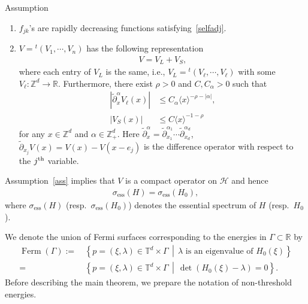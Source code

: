 \documentclass[10pt]{amsart}
\theoremstyle{definition}\newtheorem{defi}[theo]{Definition}\newtheorem{rema}[theo]{Remark}\newtheorem{exam}[theo]{Example}\newtheorem{exem}[theo]{Example}\newtheorem{nota}[theo]{Notation}
\renewcommand{\a}{\alpha}
\renewcommand{\l}{\lambda}
\newcommand{\x}{\xi}
\newcommand{\R}{\mathbb{R}}
\newcommand{\Z}{\mathbb{Z}}
\newcommand{\T}{\mathbb{T}}
\newcommand{\HS}{\mathcal{H}}
\newcommand{\la}{\langle}
\newcommand{\ra}{\rangle}
\DeclareMathOperator{\Ferm}{Ferm}
\begin{document}
\begin{enonce}{Assumption}\label{ass}\leavevmode
\begin{enumerate}
\item\label{assum1.1.1} $f_{jk}$'s are rapidly decreasing functions satisfying~\eqref{selfadj}.

\item\label{assum1.1.2} $V={}^t(V_1, \cdots, V_n)$ has the following representation
\begin{align*}
V=V_L + V_S,
\end{align*}
where each entry of $V_L$ is the same, i.e., $V_L={}^t(V_\ell, \cdots, V_\ell)$ with some $V_\ell : \Z^d \to \R$. Furthermore, there exist $\rho>0$ and $C,C_\a>0$ such that
\begin{align}
\left|\tilde\partial_x^\a V_\ell(x)\right| &\leq C_\a \la x \ra^{-\rho-|\a|}, \label{long range}
\\
|V_S(x)| &\leq C \la x \ra^{-1-\rho} \label{short range}
\end{align}
for any $x\in\Z^d$ and $\a\in\Z_+^d$. Here $\tilde\partial_x^\a=\tilde\partial_{x_1}^{\a_1} \cdots \tilde\partial_{x_d}^{\a_d}$, $\tilde \partial_{x_j} V(x)=V(x)-V(x-e_j)$ is the difference operator with respect to the $j^{\rm th}$ variable.
\end{enumerate}
\end{enonce}


Assumption~\ref{ass} implies that $V$ is a compact operator on $\HS$ and hence
\begin{align*}
\sigma_{\operatorname{ess}}(H)=\sigma_{\operatorname{ess}}(H_0),
\end{align*}
where $\sigma_{\operatorname{ess}}(H)$ (resp.\ $\sigma_{\operatorname{ess}}(H_0)$) denotes the essential spectrum of $H$ (resp.\ $H_0$).


We denote the union of Fermi surfaces corresponding to the energies in $\Gamma\subset\R$ by
\begin{align*}
\Ferm(\Gamma):=&\,\left\{ p = (\x,\l)\in\T^d\times\Gamma \,\middle|\, \l \text{ is an eigenvalue of }H_0(\x) \right\} \\
=&\, \left\{ p = (\x,\l)\in\T^d\times\Gamma \,\middle|\, \det \left(H_0(\x)-\l\right)=0 \right\}. 
\end{align*}
Before describing the main theorem, we prepare the notation of non-threshold energies.
\end{document}
